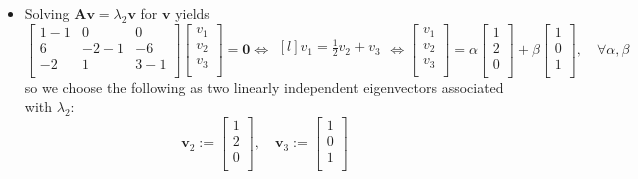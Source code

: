 \documentclass[12pt,a4paper]{article}
\begin{document}
\begin{itemize}
\begin{itemize}
  \item Solving $\bm{A}\bm{v}=\lambda_{2}\bm{v}$ for $\bm{v}$ yields
    \begin{equation}\nonumber%
      \begin{bmatrix}
        1-1 & 0 & 0 \\
        6 & -2-1 & -6 \\
        -2 & 1 & 3-1 \\
      \end{bmatrix}
      \begin{bmatrix}
        v_{1} \\
        v_{2} \\
        v_{3} \\
      \end{bmatrix}
      = \bm{0}
      \iff
      \begin{matrix*}[l]
        v_{1} =  \frac{1}{2}v_{2} + v_{3} \\
      \end{matrix*}
      \iff
      \begin{bmatrix}
        v_{1} \\
        v_{2} \\
        v_{3} \\
      \end{bmatrix}
      =
      \alpha
      \begin{bmatrix}
        1 \\
        2 \\
        0 \\
      \end{bmatrix}
      +
      \beta
      \begin{bmatrix}
        1 \\
        0 \\
        1 \\
      \end{bmatrix},
      \quad \forall \alpha, \beta
    \end{equation}
    so we choose the following as
    two linearly independent eigenvectors associated with $\lambda_{2}$:
    \begin{equation}\nonumber%
      \bm{v}_{2} := 
      \begin{bmatrix}
        1 \\
        2 \\
        0 \\
      \end{bmatrix},
      \quad
      \bm{v}_{3} := 
      \begin{bmatrix}
        1 \\
        0 \\
        1 \\
      \end{bmatrix}
    \end{equation}


\end{itemize}
\end{itemize}
\end{document}
